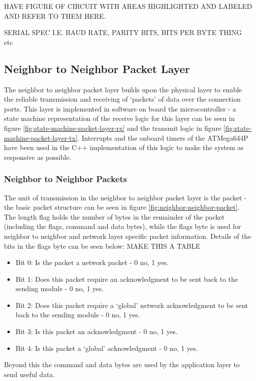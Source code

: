 HAVE FIGURE OF CIRCUIT WITH AREAS HIGHLIGHTED AND LABELED AND REFER TO THEM HERE.

SERIAL SPEC I.E. BAUD RATE, PARITY BITS, BITS PER BYTE THING etc

\subsection{Neighbor to Neighbor Packet Layer}

The neighbor to neighbor packet layer builds upon the physical layer to enable the reliable transmission and receiving of `packets' of data over the connection ports. This layer is implemented in software on board the microcontroller - a state machine representation of the receive logic for this layer can be seen in figure \ref{fig:state-machine-packet-layer-rx} and the transmit logic in figure \ref{fig:state-machine-packet-layer-tx}. Interrupts and the onboard timers of the ATMega644P have been used in the C++ implementation of this logic to make the system as responsive as possible.

\subsubsection{Neighbor to Neighbor Packets}
The unit of transmission in the neighbor to neighbor packet layer is the packet - the basic packet structure can be seen in figure \ref{fig:neighbor-neighbor-packet}. The length flag holds the number of bytes in the remainder of the packet (including the flags, command and data bytes), while the flags byte is used for neighbor to neighbor and network layer specific packet information. Details of the bits in the flags byte can be seen below: MAKE THIS A TABLE

\begin{itemize}
\item Bit 0: Is the packet a network packet - 0 no, 1 yes.
\item Bit 1: Does this packet require an acknowledgment to be sent back to the sending module - 0 no, 1 yes.
\item Bit 2: Does this packet require a `global' network acknowledgment to be sent back to the sending module - 0 no, 1 yes.
\item Bit 3: Is this packet an acknowledgment - 0 no, 1 yes.
\item Bit 4: Is this packet a `global' acknowledgment - 0 no, 1 yes.
\end{itemize}

Beyond this the command and data bytes are used by the application layer to send useful data.

